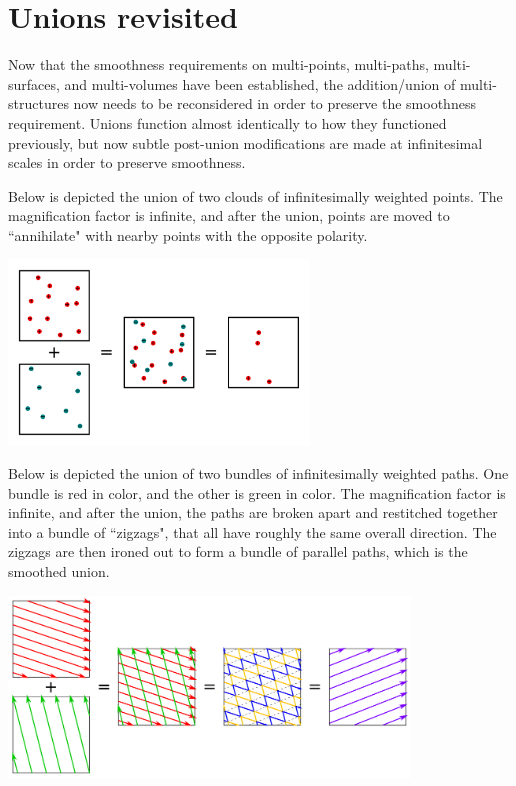 \documentclass{book}
\begin{document}
\section{Unions revisited}

Now that the smoothness requirements on multi-points, multi-paths, multi-surfaces, and multi-volumes have been established, the addition/union of multi-structures now needs to be reconsidered in order to preserve the smoothness requirement. Unions function almost identically to how they functioned previously, but now subtle post-union modifications are made at infinitesimal scales in order to preserve smoothness.  

Below is depicted the union of two clouds of infinitesimally weighted points. The magnification factor is infinite, and after the union, points are moved to ``annihilate" with nearby points with the opposite polarity. 

\begin{center}
\includegraphics[width = 0.6\textwidth]{Smoothness_and_duality/point_union_smoothing}
\end{center}

Below is depicted the union of two bundles of infinitesimally weighted paths. One bundle is red in color, and the other is green in color. The magnification factor is infinite, and after the union, the paths are broken apart and restitched together into a bundle of ``zigzags", that all have roughly the same overall direction. The zigzags are then ironed out to form a bundle of parallel paths, which is the smoothed union.

\begin{center}
\includegraphics[width = 0.8\textwidth]{Smoothness_and_duality/path_union_smoothing}
\end{center}
\end{document}
